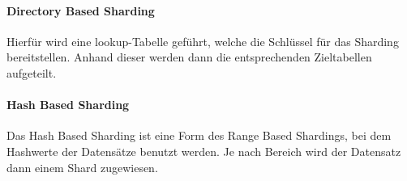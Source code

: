 \begin{flushleft}
    \paragraph{Directory Based Sharding}
    Hierfür wird eine lookup-Tabelle geführt, welche die Schlüssel für das Sharding bereitstellen.
    Anhand dieser werden dann die entsprechenden Zieltabellen aufgeteilt.
\begin{flushleft}
\end{flushleft}
    \paragraph{Hash Based Sharding}
    Das Hash Based Sharding ist eine Form des Range Based Shardings, bei dem Hashwerte der Datensätze benutzt werden.
    Je nach Bereich wird der Datensatz dann einem Shard zugewiesen.
\end{flushleft}